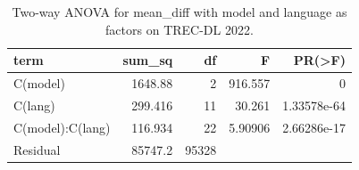 \begin{table}
\caption{Two-way ANOVA for mean_diff with model and language as factors on TREC-DL 2022.}
\label{tab:anova_language_model_mean_diff_2022}
\begin{tabular}{l r r r r}
\toprule
term & sum_sq & df & F & PR(>F) \\
\midrule
C(model) & 1648.88 & 2 & 916.557 & 0 \\
C(lang) & 299.416 & 11 & 30.261 & 1.33578e-64 \\
C(model):C(lang) & 116.934 & 22 & 5.90906 & 2.66286e-17 \\
Residual & 85747.2 & 95328 &  &  \\
\bottomrule
\end{tabular}
\end{table}
